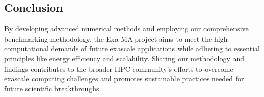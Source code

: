 \subsection*{Conclusion}

By developing advanced numerical methods and employing our comprehensive benchmarking methodology, the Exa-MA project aims to meet the high computational demands of future exascale applications while adhering to essential principles like energy efficiency and scalability. Sharing our methodology and findings contributes to the broader HPC community's efforts to overcome exascale computing challenges and promotes sustainable practices needed for future scientific breakthroughs.

